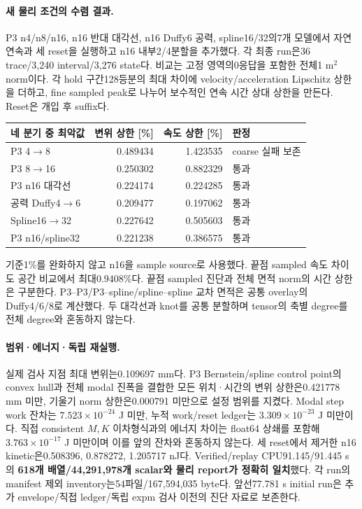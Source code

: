 \documentclass[10pt]{article}
\begin{document}
\paragraph{새 물리 조건의 수렴 결과.}
P3 n4/n8/n16, n16 반대 대각선, n16 Duffy6 공력, spline16/32의7개 모델에서
자연 연속과 세 reset을 실행하고 n16 내부2/4분할을 추가했다.
각 최종 run은36 trace/3,240 interval/3,276 state다. 비교는 고정 영역의0응답을 포함한 전체1 m$^2$ norm이다.
각 hold 구간128등분의 최대 차이에 velocity/acceleration Lipschitz 상한을 더하고,
fine sampled peak로 나누어 보수적인 연속 시간 상대 상한을 만든다. Reset은 개입 후 suffix다.
\begin{longtable}{lrrl}
\toprule 네 분기 중 최악값 & 변위 상한 [\%] & 속도 상한 [\%] & 판정\\\midrule
P3 4$\to$8 & 0.489434 & 1.423535 & coarse 실패 보존\\
P3 8$\to$16 & 0.250302 & 0.882329 & 통과\\
P3 n16 대각선 & 0.224174 & 0.224285 & 통과\\
공력 Duffy4$\to$6 & 0.209477 & 0.197062 & 통과\\
Spline16$\to$32 & 0.227642 & 0.505603 & 통과\\
P3 n16/spline32 & 0.221238 & 0.386575 & 통과\\
\bottomrule\end{longtable}
기준1\%를 완화하지 않고 n16을 sample source로 사용했다. 끝점 sampled 속도 차이도 공간 비교에서
최대0.9408\%다. 끝점 sampled 진단과 전체 면적 norm의 시간 상한은 구분한다.
P3--P3/P3--spline/spline--spline 교차 면적은 공통 overlay의 Duffy4/6/8로 계산했다.
두 대각선과 knot를 공통 분할하며 tensor의 축별 degree를 전체 degree와 혼동하지 않는다.

\paragraph{범위·에너지·독립 재실행.}
실제 검사 지점 최대 변위는0.109697 mm다. P3 Bernstein/spline control point의 convex hull과
전체 modal 진폭을 결합한 모든 위치·시간의 변위 상한은0.421778 mm 미만,
기울기 norm 상한은0.000791 미만으로 설정 범위를 지켰다.
Modal step work 잔차는 \(7.523\times10^{-24}\) J 미만, 누적 work/reset ledger는
\(3.309\times10^{-23}\) J 미만이다. 직접 consistent \(M,K\) 이차형식과의 에너지 차이는
float64 상쇄를 포함해 \(3.763\times10^{-17}\) J 미만이며 이를 앞의 잔차와 혼동하지 않는다.
세 reset에서 제거한 n16 kinetic은0.508396, 0.878272, 1.205717 nJ다.
Verified/replay CPU91.145/91.445 s의 \textbf{618개 배열/44,291,978개 scalar와 물리 report가 정확히 일치}했다.
각 run의 manifest 제외 inventory는54파일/167,594,035 byte다. 앞선77.781 s initial run은
추가 envelope/직접 ledger/독립 expm 검사 이전의 진단 자료로 보존한다.
\end{document}
